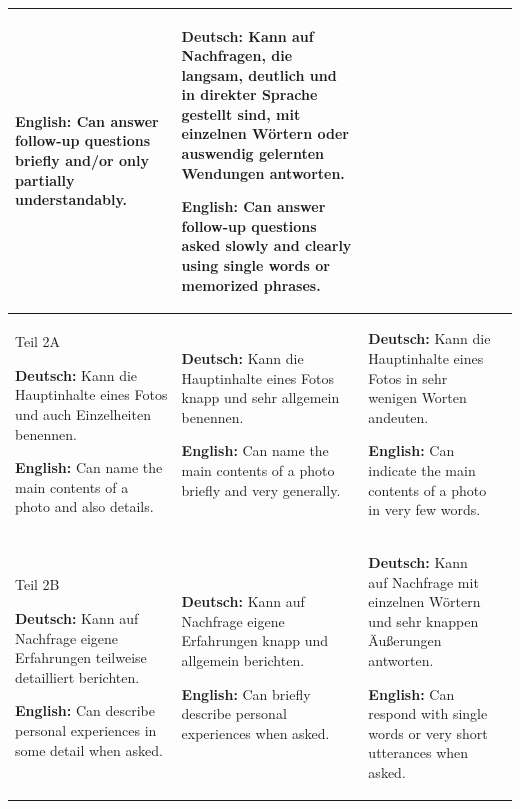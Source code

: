 \documentclass[a4paper]{article}
\begin{document}
\begin{table}[H]
\begin{tabular}{|p{3cm}|p{4cm}|p{4cm}|p{4cm}|}
                    \textbf{English:} Can answer follow-up questions briefly and/or only partially understandably.
                    &
                    \textbf{Deutsch:} Kann auf Nachfragen, die langsam, deutlich und in direkter Sprache gestellt sind, mit einzelnen Wörtern oder auswendig gelernten Wendungen antworten.
                    
                    \textbf{English:} Can answer follow-up questions asked slowly and clearly using single words or memorized phrases.
                    \\
                    \hline
                    
                    Teil 2A
                    
                    \textbf{Deutsch:} Kann die Hauptinhalte eines Fotos und auch Einzelheiten benennen.
                    
                    \textbf{English:} Can name the main contents of a photo and also details.
                    &
                    \textbf{Deutsch:} Kann die Hauptinhalte eines Fotos knapp und sehr allgemein benennen.
                    
                    \textbf{English:} Can name the main contents of a photo briefly and very generally.
                    &
                    \textbf{Deutsch:} Kann die Hauptinhalte eines Fotos in sehr wenigen Worten andeuten.
                    
                    \textbf{English:} Can indicate the main contents of a photo in very few words.
                    \\
                    \hline
                    
                    Teil 2B
                    
                    \textbf{Deutsch:} Kann auf Nachfrage eigene Erfahrungen teilweise detailliert berichten.
                    
                    \textbf{English:} Can describe personal experiences in some detail when asked.
                    &
                    \textbf{Deutsch:} Kann auf Nachfrage eigene Erfahrungen knapp und allgemein berichten.
                    
                    \textbf{English:} Can briefly describe personal experiences when asked.
                    &
                    \textbf{Deutsch:} Kann auf Nachfrage mit einzelnen Wörtern und sehr knappen Äußerungen antworten.
                    
                    \textbf{English:} Can respond with single words or very short utterances when asked.
                    \\
                    \hline
                    

\end{tabular}
\end{table}
\end{document}
